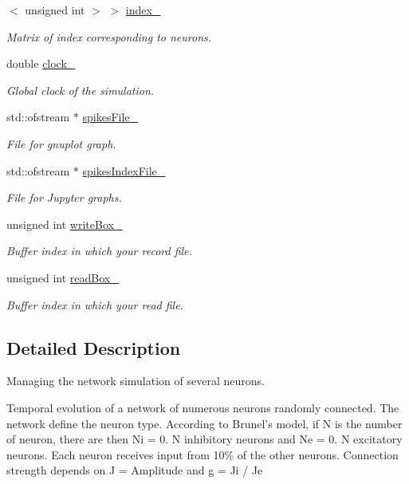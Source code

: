 \begin{DoxyCompactItemize}
$<$ unsigned int $>$ $>$ \hyperlink{classNetwork_ac1a1521c153f98e81c3fc57c09e29435}{index\-\_\-}
\begin{DoxyCompactList}\small\item\em Matrix of index corresponding to neurons. \end{DoxyCompactList}\item 
double \hyperlink{classNetwork_a56ae0c805aa9ab5a7eda4e17a6c5ca0a}{clock\-\_\-}
\begin{DoxyCompactList}\small\item\em Global clock of the simulation. \end{DoxyCompactList}\item 
std\-::ofstream $\ast$ \hyperlink{classNetwork_a93e82bb1f3a243c36658f17d7579312a}{spikes\-File\-\_\-}
\begin{DoxyCompactList}\small\item\em File for gnuplot graph. \end{DoxyCompactList}\item 
std\-::ofstream $\ast$ \hyperlink{classNetwork_ae1ca8efaa48617ef6114c101227f6ac0}{spikes\-Index\-File\-\_\-}
\begin{DoxyCompactList}\small\item\em File for Jupyter graphs. \end{DoxyCompactList}\item 
unsigned int \hyperlink{classNetwork_a431377135d1e87dd3c2481308909cf96}{write\-Box\-\_\-}
\begin{DoxyCompactList}\small\item\em Buffer index in which your record file. \end{DoxyCompactList}\item 
unsigned int \hyperlink{classNetwork_a6e1a50329d78f8b7e4b63f6c441a83d0}{read\-Box\-\_\-}
\begin{DoxyCompactList}\small\item\em Buffer index in which your read file. \end{DoxyCompactList}\end{DoxyCompactItemize}


\subsection{Detailed Description}
Managing the network simulation of several neurons. 

Temporal evolution of a network of numerous neurons randomly connected. The network define the neuron type. According to Brunel's model, if N is the number of neuron, there are then Ni = 0. N inhibitory neurons and Ne = 0. N excitatory neurons. Each neuron receives input from 10\% of the other neurons. Connection strength depends on J = Amplitude and g = Ji / Je

